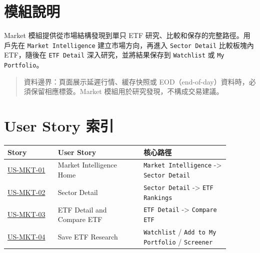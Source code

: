 \section{模組說明}
Market 模組提供從市場結構發現到單只 ETF 研究、比較和保存的完整路徑。用戶先在 \texttt{Market Intelligence} 建立市場方向，再進入 \texttt{Sector Detail} 比較板塊內 ETF，隨後在 \texttt{ETF Detail} 深入研究，並將結果保存到 \texttt{Watchlist} 或 \texttt{My Portfolio}。
\begin{quote}\small 資料邊界：頁面展示延遲行情、緩存快照或 EOD（end-of-day）資料時，必須保留相應標簽。Market 模組用於研究發現，不構成交易建議。\end{quote}
\section{User Story 索引}
\begingroup
\small
\begin{longtable}{L{0.20\linewidth}L{0.34\linewidth}L{0.34\linewidth}}
\toprule
\textbf{Story} & \textbf{User Story} & \textbf{核心路徑} \\
\midrule
\hyperlink{us-mkt-01}{US-MKT-01} & Market Intelligence Home & \texttt{Market Intelligence} -\textgreater{} \texttt{Sector Detail} \\
\hyperlink{us-mkt-02}{US-MKT-02} & Sector Detail & \texttt{Sector Detail} -\textgreater{} \texttt{ETF Rankings} \\
\hyperlink{us-mkt-03}{US-MKT-03} & ETF Detail and Compare ETF & \texttt{ETF Detail} -\textgreater{} \texttt{Compare ETF} \\
\hyperlink{us-mkt-04}{US-MKT-04} & Save ETF Research & \texttt{Watchlist} /\allowbreak{} \texttt{Add to My Portfolio} /\allowbreak{} \texttt{Screener} \\
\bottomrule
\end{longtable}
\endgroup
